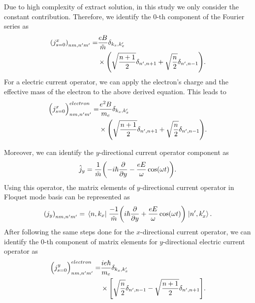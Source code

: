 Due to high complexity of extract solution, in this study we only consider the constant contribution. Therefore, we identify the $0$-th component of the Fourier series as
\begin{equation} \label{eq_d10}
  \begin{aligned}
      \qty({j}^x_{s=0})_{nm,n'm'} =&
      \frac{eB}{{\tilde{m}}}
      \delta_{k_x,k'_x} \\
      & \times
      \qty(\sqrt{\frac{n+1}{2}} \delta_{n',n+1} + \sqrt{\frac{n}{2}}
      \delta_{n',n-1}).
  \end{aligned}
\end{equation}
For a electric current operator, we can apply the electron's charge and the  effective mass of the electron to the above derived equation. This leads to
\begin{equation} \label{eq_d11}
  \begin{aligned}
      \Big({j}^x_{s=0}\Big)_{nm,n'm'}^{electron} =&
      \frac{e^2B}{{m_e}}
      \delta_{k_x,k'_x}\\
      & \times
      \qty(\sqrt{\frac{n+1}{2}} \delta_{n',n+1} + \sqrt{\frac{n}{2}}
      \delta_{n',n-1}).
  \end{aligned}
\end{equation}

Moreover, we can identify the $y$-directional current operator component as
\begin{equation} \label{eq_d12}
  \hat{j}_y = \frac{1}{\tilde{m}} \qty(-i\hbar\pdv{y} - \frac{eE}{\omega}\cos(\omega t)).
\end{equation}
Using this operator, the matrix elements of $y$-directional current operator in Floquet mode basis can be represented as
\begin{equation} \label{eq_d13}
  \qty({j}_y)_{nm,n'm'} =
  \mel{n,k_x}{\;\frac{-1}{\tilde{m}} \qty(i\hbar\pdv{y} + \frac{eE}{\omega}\cos(\omega t))\;}{n',k'_x}.
\end{equation}
After following the same steps done for the $x$-directional current operator, we can identify the $0$-th component of matrix elements for $y$-directional electric current operator as
\begin{equation} \label{eq_d14}
  \begin{aligned}
    \Big({j}^y_{s=0}\Big)_{nm,n'm'}^{electron} = &
    \frac{ie\hbar}{{m_e}}
    \delta_{k_x,k'_x} \\
    & \times
    \qty[
    \sqrt{\frac{n}{2}} \delta_{n',n-1}
    - \sqrt{\frac{n+1}{2}} \delta_{n',n+1}
    ].
  \end{aligned}
\end{equation}
